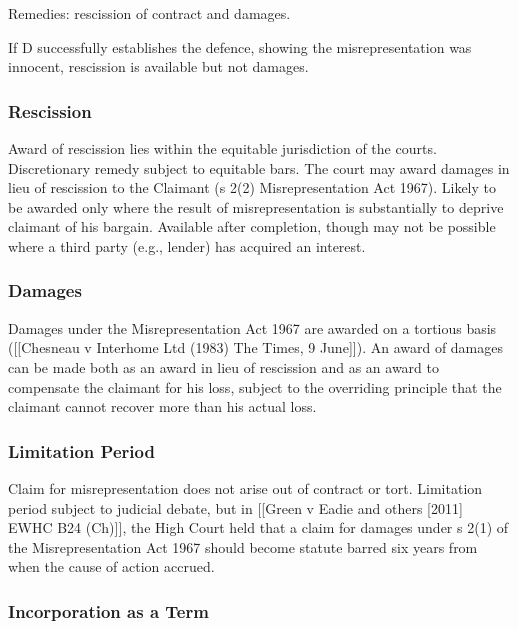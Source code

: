 \documentclass[
]{article}
\begin{document}
Remedies: rescission of contract and damages.

If D successfully establishes the defence, showing the misrepresentation
was innocent, rescission is available but not damages.

\hypertarget{rescission-1}{%
\subsubsection{Rescission}\label{rescission-1}}

Award of rescission lies within the equitable jurisdiction of the
courts. Discretionary remedy subject to equitable bars. The court may
award damages in lieu of rescission to the Claimant (s 2(2)
Misrepresentation Act 1967). Likely to be awarded only where the result
of misrepresentation is substantially to deprive claimant of his
bargain. Available after completion, though may not be possible where a
third party (e.g., lender) has acquired an interest.

\hypertarget{damages-1}{%
\subsubsection{Damages}\label{damages-1}}

Damages under the Misrepresentation Act 1967 are awarded on a tortious
basis ({[}{[}Chesneau v Interhome Ltd (1983) The Times, 9 June{]}{]}).
An award of damages can be made both as an award in lieu of rescission
and as an award to compensate the claimant for his loss, subject to the
overriding principle that the claimant cannot recover more than his
actual loss.

\hypertarget{limitation-period}{%
\subsubsection{Limitation Period}\label{limitation-period}}

Claim for misrepresentation does not arise out of contract or tort.
Limitation period subject to judicial debate, but in {[}{[}Green v Eadie
and others {[}2011{]} EWHC B24 (Ch){]}{]}, the High Court held that a
claim for damages under s 2(1) of the Misrepresentation Act 1967 should
become statute barred six years from when the cause of action accrued.

\hypertarget{incorporation-as-a-term}{%
\subsubsection{Incorporation as a Term}\label{incorporation-as-a-term}}
\end{document}
